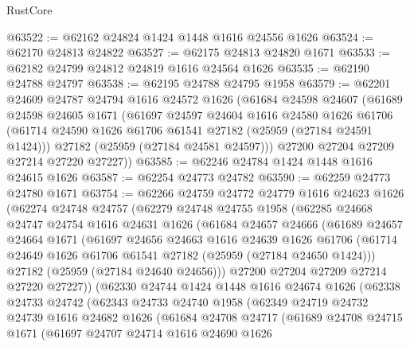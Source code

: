 \begin{lexlean}{RustCore}
\begin{coremodule}
@63522 := @62162 @24824 @1424 @1448 @1616 @24556 @1626
@63524 := @62170 @24813 @24822
@63527 := @62175 @24813 @24820 @1671
@63533 := @62182 @24799 @24812 @24819 @1616 @24564 @1626
@63535 := @62190 @24788 @24797
@63538 := @62195 @24788 @24795 @1958
@63579 := @62201
    @24609
    @24787
    @24794
    @1616
    @24572
    @1626
    (@61684
      @24598
      @24607
      (@61689
        @24598
        @24605
        @1671
        (@61697
          @24597
          @24604
          @1616
          @24580
          @1626
          @61706
          (@61714 @24590 @1626 @61706 @61541 @27182 (@25959 (@27184 @24591 @1424)))
          @27182
          (@25959 (@27184 @24581 @24597)))
        @27200
        @27204
        @27209
        @27214
        @27220
        @27227))
@63585 := @62246 @24784 @1424 @1448 @1616 @24615 @1626
@63587 := @62254 @24773 @24782
@63590 := @62259 @24773 @24780 @1671
@63754 := @62266
    @24759
    @24772
    @24779
    @1616
    @24623
    @1626
    (@62274
      @24748
      @24757
      (@62279
        @24748
        @24755
        @1958
        (@62285
          @24668
          @24747
          @24754
          @1616
          @24631
          @1626
          (@61684
            @24657
            @24666
            (@61689
              @24657
              @24664
              @1671
              (@61697
                @24656
                @24663
                @1616
                @24639
                @1626
                @61706
                (@61714 @24649 @1626 @61706 @61541 @27182 (@25959 (@27184 @24650 @1424)))
                @27182
                (@25959 (@27184 @24640 @24656)))
              @27200
              @27204
              @27209
              @27214
              @27220
              @27227))
          (@62330
            @24744
            @1424
            @1448
            @1616
            @24674
            @1626
            (@62338
              @24733
              @24742
              (@62343
                @24733
                @24740
                @1958
                (@62349
                  @24719
                  @24732
                  @24739
                  @1616
                  @24682
                  @1626
                  (@61684
                    @24708
                    @24717
                    (@61689
                      @24708
                      @24715
                      @1671
                      (@61697
                        @24707
                        @24714
                        @1616
                        @24690
                        @1626

\end{coremodule}
\end{lexlean}
